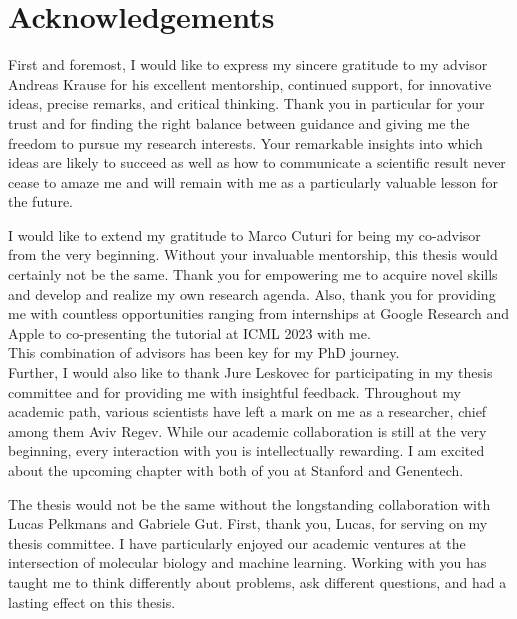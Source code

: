 
\bigskip

\begingroup
\let\clearpage\relax
\let\cleardoublepage\relax
\let\cleardoublepage\relax
\chapter*{Acknowledgements}

\def\thanks#1{%
\begingroup
\leftskip1em
\noindent #1
\par
\endgroup
}

First and foremost, I would like to express my sincere gratitude to my advisor Andreas Krause for his excellent mentorship, continued support, for innovative ideas, precise remarks, and critical thinking.
Thank you in particular for your trust and for finding the right balance between guidance and giving me the freedom to pursue my research interests.
Your remarkable insights into which ideas are likely to succeed as well as how to communicate a scientific result never cease to amaze me and will remain with me as a particularly valuable lesson for the future.

I would like to extend my gratitude to Marco Cuturi for being my co-advisor from the very beginning. 
Without your invaluable mentorship, this thesis would certainly not be the same. Thank you for empowering me to acquire novel skills and develop and realize my own research agenda.
Also, thank you for providing me with countless opportunities ranging from internships at Google Research and Apple to co-presenting the tutorial at ICML 2023 with me. \\
This combination of advisors has been key for my PhD journey. \\

Further, I would also like to thank Jure Leskovec for participating in my thesis committee and for providing me with insightful feedback. 
Throughout my academic path, various scientists have left a mark on me as a researcher, chief among them Aviv Regev. While our academic collaboration is still at the very beginning, every interaction with you is intellectually rewarding.
I am excited about the upcoming chapter with both of you at Stanford and Genentech.

 The thesis would not be the same without the longstanding collaboration with Lucas Pelkmans and Gabriele Gut. First, thank you, Lucas, for serving on my thesis committee.
I have particularly enjoyed our academic ventures at the intersection  of molecular biology and machine learning. Working with you has taught me to think differently about problems, ask different questions, and had a lasting effect on this thesis.

